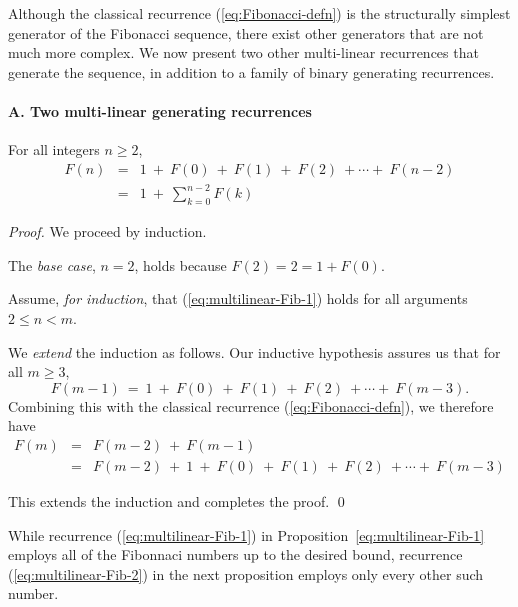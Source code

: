 Although the classical recurrence (\ref{eq:Fibonacci-defn}) is the
structurally simplest generator of the Fibonacci sequence, there exist
other generators that are not much more complex.  We now present two
other multi-linear recurrences that generate the sequence, in addition
to a family of binary generating recurrences.

\paragraph{\small\sf A. Two multi-linear generating recurrences}

\begin{prop}
\label{thm:FiboSum-1}
For all integers $n \geq 2$,
\begin{eqnarray}
\label{eq:multilinear-Fib-1}
F(n) & = &
1 \ + \ F(0) \ + \ F(1) \ + \ F(2) \ + \cdots + \ F(n-2) \\
\nonumber
     & = &
1 \ + \ \sum_{k=0}^{n-2} F(k)
\end{eqnarray}
\end{prop}

\begin{proof}
We proceed by induction.

\noindent
The {\em base case}, $n=2$, holds because $F(2) = 2 =  1 + F(0)$.

\noindent 
Assume, {\em for induction}, that 
(\ref{eq:multilinear-Fib-1}) holds for all arguments $2 \leq n < m$.

\noindent
We {\em extend} the induction as follows.  Our inductive hypothesis
assures us that for all $m \geq 3$,
\[ F(m-1) \ = \ 1 \ + \ F(0) \ + \ F(1) \ + \ F(2) \ + \cdots + \ F(m-3). \]
Combining this with the classical recurrence
(\ref{eq:Fibonacci-defn}), we therefore have
\begin{eqnarray*}
F(m) & = & F(m-2) \ + \ F(m-1) \\
     & = &
F(m-2) \ + \ 1 \ + \ F(0) \ + \ F(1) \ + \ F(2) \ + \cdots + \ F(m-3)
\end{eqnarray*}

\noindent
This extends the induction and completes the proof.
\qed
\end{proof}

\medskip

While recurrence (\ref{eq:multilinear-Fib-1}) in
Proposition~\ref{eq:multilinear-Fib-1} employs all of the Fibonnaci
numbers up to the desired bound, recurrence
(\ref{eq:multilinear-Fib-2}) in the next proposition employs only
every other such number.

